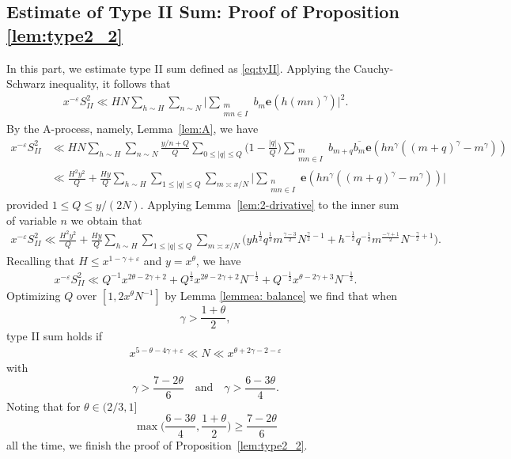 \documentclass[12pt, reqno, twoside, letterpaper]{amsart}
\numberwithin{equation}{section}
\newcommand{\e}{\ensuremath{\mathbf{e}}}
\theoremstyle{customthm}
\theoremstyle{customrem}
\begin{document}
\subsection{Estimate of Type II Sum: Proof of Proposition \ref{lem:type2_2}}\label{Estimate of Type II Sum}
In this part, we estimate type II sum defined as \eqref{eq:tyII}. Applying the Cauchy-Schwarz inequality, it follows that
\begin{align*}
	x^{-\varepsilon}S_{II}^2 \ll HN \sum_{h \sim H} \sum_{n \sim N} \Big| \sum_{\substack{m \\ mn\in I}} b_m \e(h(mn)^{\gamma}) \Big|^2.
\end{align*}
By the A-process, namely, Lemma~\ref{lem:A}, we have
\begin{align*}
	x^{-\varepsilon}S_{II}^2 &\ll HN \sum_{h \sim H} \sum_{n \sim N} \frac{y/n+Q}{Q} \sum_{0 \leqslant |q| \leqslant Q}\big( 1-\frac{|q|}{Q} \big) \sum_{\substack{m \\ mn \in I}}b_{m+q}\overline{b_m} \e(hn^\gamma((m+q)^{\gamma}-m^{\gamma})) \\
	& \ll \frac{H^2y^2}{Q} + \frac{Hy}{Q} \sum_{h \sim H} \sum_{1 \leqslant |q| \leqslant Q} \sum_{m \asymp x/N} \Big| \sum_{\substack{n \\ mn\in I}} \e(hn^\gamma((m+q)^{\gamma}-m^{\gamma})) \Big|
\end{align*}
provided $1 \leqslant Q \leqslant y/(2N).$ Applying Lemma~\ref{lem:2-drivative} to the inner sum of variable $n$ we obtain that
\begin{align*}
	x^{-\varepsilon}S_{II}^2 \ll \frac{H^2y^2}{Q} + \frac{Hy}{Q} \sum_{h \sim H} \sum_{1 \leqslant |q| \leqslant Q} \sum_{m \asymp x/N} \bigg( yh^{\frac{1}{2}}q^{\frac{1}{2}}m^{\frac{\gamma-3}{2}}N^{\frac{\gamma}{2}-1} + h^{-\frac{1}{2}}q^{-\frac{1}{2}}m^{\frac{-\gamma+1}{2}}N^{-\frac{\gamma}{2}+1} \bigg).
\end{align*}
Recalling that $H \leqslant x^{1-\gamma+\varepsilon}$ and $y=x^{\theta}$, we have
\begin{align*}
	x^{-\varepsilon}S_{II}^2 \ll Q^{-1}x^{2\theta - 2\gamma +2} + Q^{\frac{1}{2}} x^{2\theta - 2\gamma +2} N^{-\frac{1}{2}} + Q^{-\frac{1}{2}} x^{\theta - 2\gamma +3} N^{-\frac{1}{2}}.
\end{align*}
Optimizing $Q$ over $[1,2x^{\theta}N^{-1}]$ by Lemma \ref{lemmea: balance} we find that when 
$$
\gamma > \frac{1+\theta}{2},
$$
type II sum holds if
\begin{align*}
	x^{5-\theta-4\gamma+\varepsilon} \ll N \ll x^{\theta +2\gamma-2-\varepsilon} 
\end{align*}
with
$$
\gamma > \frac{7-2\theta}{6} \quad \text{and} \quad \gamma > \frac{6-3\theta}{4}.
$$
Noting that for $\theta\in (2/3,1]$
$$
\max\big(\frac{6-3\theta}{4},\frac{1+\theta}{2}\big) \geqslant \frac{7-2\theta}{6}
$$
all the time, we finish the proof of Proposition~\ref{lem:type2_2}.
\end{document}
